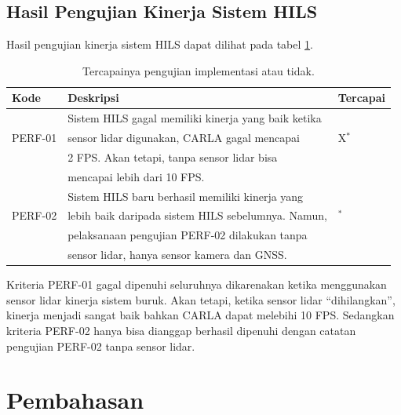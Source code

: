 \subsection{Hasil Pengujian Kinerja Sistem HILS}

Hasil pengujian kinerja sistem HILS dapat dilihat pada tabel \ref{chapter-4-tbl-perf-criteria-result}.

\begin{table}[!htbp]
	\begin{center}
		\begin{tabular}{|l|l|l|}
			\hline
			\textbf{Kode} & \textbf{Deskripsi}                                  & \textbf{Tercapai} \\
			\hline
			              & Sistem HILS gagal memiliki kinerja yang baik ketika &                   \\
			PERF-01       & sensor lidar digunakan, CARLA gagal mencapai        & X$^*$             \\
			              & 2 FPS. Akan tetapi, tanpa sensor lidar bisa         &                   \\
			              & mencapai lebih dari 10 FPS.                         &                   \\
			\hline
			              & Sistem HILS baru berhasil memiliki kinerja yang     &                   \\
			PERF-02       & lebih baik daripada sistem HILS sebelumnya. Namun,  & \checkmark$^*$    \\
			              & pelaksanaan pengujian PERF-02 dilakukan tanpa       &                   \\
			              & sensor lidar, hanya sensor kamera dan GNSS.         &                   \\
			\hline
		\end{tabular}
	\end{center}

	\caption{Tercapainya pengujian implementasi atau tidak.}
	\label{chapter-4-tbl-perf-criteria-result}
\end{table}

Kriteria PERF-01 gagal dipenuhi seluruhnya dikarenakan ketika menggunakan sensor
lidar kinerja sistem buruk. Akan tetapi, ketika sensor lidar ``dihilangkan'',
kinerja menjadi sangat baik bahkan CARLA dapat melebihi 10 FPS. Sedangkan
kriteria PERF-02 hanya bisa dianggap berhasil dipenuhi dengan catatan pengujian
PERF-02 tanpa sensor lidar.

\section{Pembahasan}
\blindtext
